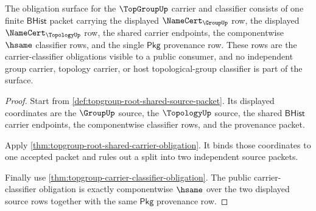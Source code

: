 \begin{theorem}
\label{thm:topgroup-obligation-carrier-classifier-surface}
The obligation surface for the $\TopGroupUp$ carrier and classifier consists of
one finite $\mathsf{BHist}$ packet carrying the displayed
$\NameCert_{\GroupUp}$ row, the displayed $\NameCert_{\TopologyUp}$ row, the
shared carrier endpoints, the componentwise $\hsame$ classifier rows, and the
single $\mathsf{Pkg}$ provenance row. These rows are the carrier-classifier
obligations visible to a public consumer, and no independent group carrier,
topology carrier, or host topological-group classifier is part of the surface.
\end{theorem}
\begin{proof}
Start from \autoref{def:topgroup-root-shared-source-packet}. Its displayed
coordinates are the $\GroupUp$ source, the $\TopologyUp$ source, the shared
$\mathsf{BHist}$ carrier endpoints, the componentwise classifier rows, and the
provenance packet.

Apply \autoref{thm:topgroup-root-shared-carrier-obligation}. It binds those
coordinates to one accepted packet and rules out a split into two independent
source packets.

Finally use \autoref{thm:topgroup-carrier-classifier-obligation}. The public
carrier-classifier obligation is exactly componentwise $\hsame$ over the two
displayed source rows together with the same $\mathsf{Pkg}$ provenance row.
\end{proof}

